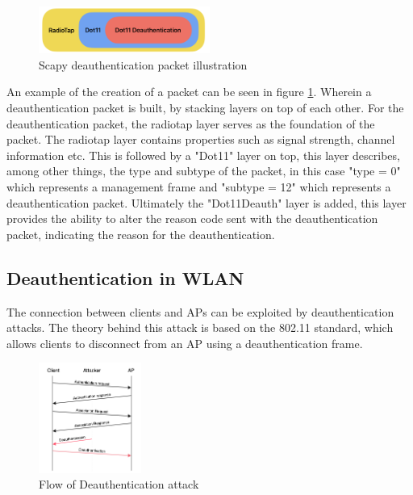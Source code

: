\begin{figure}[!htbp]
    \centering
    \includegraphics[width=0.5\textwidth]{Latex-Files/Billeder/scapy_packet.png}
    \caption{Scapy deauthentication packet illustration}
    \label{scapy_packet}
\end{figure}

An example of the creation of a packet can be seen in figure \ref{scapy_packet}. Wherein a deauthentication packet is built, by stacking layers on top of each other. For the deauthentication packet, the radiotap layer serves as the foundation of the packet. The radiotap layer contains properties such as signal strength, channel information etc. This is followed by a "Dot11" layer on top, this layer describes, among other things, the type and subtype of the packet, in this case "type = 0" which represents a management frame and "subtype = 12" which represents a deauthentication packet. Ultimately the "Dot11Deauth" layer is added, this layer provides the ability to alter the reason code sent with the deauthentication packet, indicating the reason for the deauthentication.\cite{Scapy_documentation}


\subsection{Deauthentication in WLAN}
The connection between clients and APs can be exploited by deauthentication attacks. The theory behind this attack is based on the 802.11 standard, which allows clients to disconnect from an AP using a deauthentication frame\cite{IEEE802.11}.

\begin{figure}[!htbp]
    \centering
    \includegraphics[width=0.3\textwidth]{Latex-Files/Billeder/Implementation/deauth_transmission.png}
    \caption{Flow of Deauthentication attack}
    \label{deauth_flow}
\end{figure}

